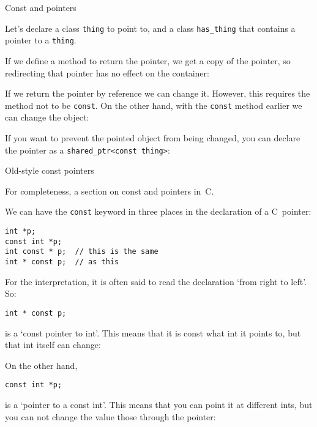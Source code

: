  {Const and pointers}

Let's declare a class \lstinline{thing} to point to, and a class \lstinline{has_thing}
that contains a pointer to a \lstinline{thing}.

\begin{multicols}{2}
\end{multicols}

If we define a method to return the pointer, we get a copy of the
pointer, so redirecting that pointer has no effect on the container:
%

If we return the pointer by reference we can
change it. However, this requires the method not to be \lstinline{const}.
On the other hand, with the \lstinline{const} method earlier we can change the
object:
%

If you want to prevent the pointed object from being changed, you can
declare the pointer as a \lstinline+shared_ptr<const thing>+:
%
\begin{multicols}{2}
\end{multicols}

 {Old-style const pointers}

For completeness, a section on const and pointers in~C.

We can have the \lstinline{const} keyword in three places
in the declaration of a C~pointer:
\begin{lstlisting}
int *p;
const int *p;
int const * p;  // this is the same
int * const p;  // as this
\end{lstlisting}

For the interpretation, it is often said to read the declaration
`from right to left'.
So:
\begin{lstlisting}
int * const p;
\end{lstlisting}
is a `const pointer to int'.
This means that it is const what int it points to,
but that int itself can change:

On the other hand,
\begin{lstlisting}
const int *p;
\end{lstlisting}
is a `pointer to a const int'.
This means that you can point it at different ints,
but you can not change the value those through the pointer:

